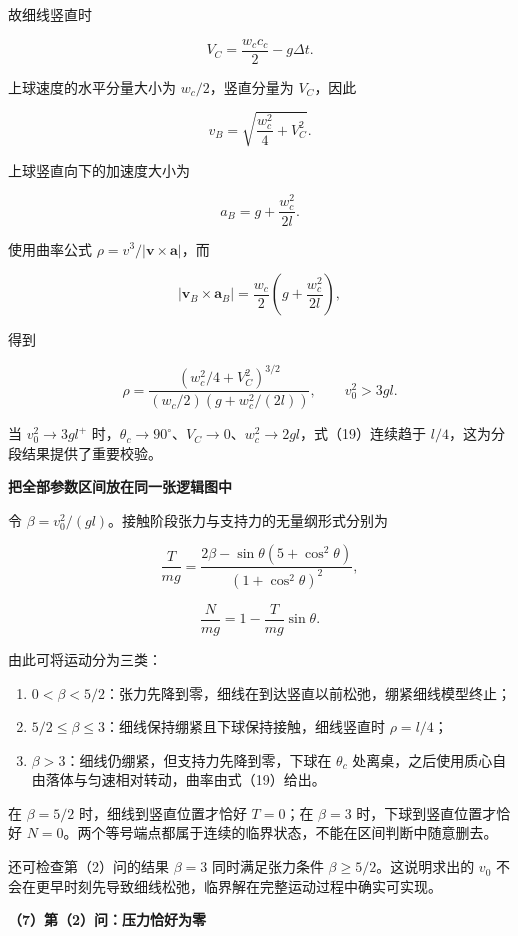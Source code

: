 \documentclass[12pt,a4paper,UTF8]{ctexart}
\newcommand{\tightlist}{\setlength{\itemsep}{0pt}\setlength{\parskip}{0pt}}
\begin{document}
故细线竖直时

\[
V_C=\frac{w_c c_c}{2}-g\Delta t.
\tag{17}
\]

上球速度的水平分量大小为 \(w_c/2\)，竖直分量为 \(V_C\)，因此

\[
v_B=\sqrt{\frac{w_c^2}{4}+V_C^2}.
\tag{18}
\]

上球竖直向下的加速度大小为

\[
a_B=g+\frac{w_c^2}{2l}.
\]

使用曲率公式 \(\rho=v^3/|\bm v\times\bm a|\)，而

\[
|\bm v_B\times\bm a_B|
=\frac{w_c}{2}\left(g+\frac{w_c^2}{2l}\right),
\]

得到

\[
\boxed{
\rho=
\frac{\left(w_c^2/4+V_C^2\right)^{3/2}}
{(w_c/2)\left(g+w_c^2/(2l)\right)}
},\qquad v_0^2>3gl.
\tag{19}
\]

当 \(v_0^2\to3gl^+\)
时，\(\theta_c\to90^\circ\)、\(V_C\to0\)、\(w_c^2\to2gl\)，式（19）连续趋于
\(l/4\)，这为分段结果提供了重要校验。

\textbf{把全部参数区间放在同一张逻辑图中}

令 \(\beta=v_0^2/(gl)\)。接触阶段张力与支持力的无量纲形式分别为

\[
\frac{T}{mg}
=\frac{2\beta-\sin\theta(5+\cos^2\theta)}
{(1+\cos^2\theta)^2},
\]

\[
\frac{N}{mg}
=1-\frac{T}{mg}\sin\theta.
\]

由此可将运动分为三类：

\begin{enumerate}
\def\labelenumi{\arabic{enumi}.}
\tightlist
\item
  \(0<\beta<5/2\)：张力先降到零，细线在到达竖直以前松弛，绷紧细线模型终止；
\item
  \(5/2\leq\beta\leq3\)：细线保持绷紧且下球保持接触，细线竖直时
  \(\rho=l/4\)；
\item
  \(\beta>3\)：细线仍绷紧，但支持力先降到零，下球在 \(\theta_c\)
  处离桌，之后使用质心自由落体与匀速相对转动，曲率由式（19）给出。
\end{enumerate}

在 \(\beta=5/2\) 时，细线到竖直位置才恰好 \(T=0\)；在 \(\beta=3\)
时，下球到竖直位置才恰好
\(N=0\)。两个等号端点都属于连续的临界状态，不能在区间判断中随意删去。

还可检查第（2）问的结果 \(\beta=3\) 同时满足张力条件
\(\beta\geq5/2\)。这说明求出的 \(v_0\)
不会在更早时刻先导致细线松弛，临界解在完整运动过程中确实可实现。

\textbf{（7）第（2）问：压力恰好为零}
\end{document}
